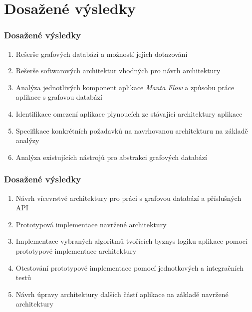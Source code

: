 \documentclass{beamer}
\newcounter{saveenumi}
\newcommand{\seti}{\setcounter{saveenumi}{\value{enumi}}}
\newcommand{\conti}{\setcounter{enumi}{\value{saveenumi}}}
\begin{document}
\section{Dosažené výsledky}
\begin{frame}
\frametitle{Dosažené výsledky}
   \begin{enumerate}
      \item Rešerše grafových databází a možností jejich dotazování
      \item Rešerše softwarových architektur vhodných pro návrh architektury
      \item Analýza jednotlivých komponent aplikace \textit{Manta Flow} a způsobu práce aplikace s grafovou databází
      \item Identifikace omezení aplikace plynoucích ze stávající architektury aplikace
      \item Specifikace konkrétních požadavků na navrhovanou architekturu na základě analýzy
      \item Analýza existujících nástrojů pro abstrakci grafových databází
      \seti
   \end{enumerate}
\end{frame}
\begin{frame}
\frametitle{Dosažené výsledky}
   \begin{enumerate}
      \conti
      \item Návrh vícevrstvé architektury pro práci s grafovou databází a příslušných API
      \item Prototypová implementace navržené architektury
      \item Implementace vybraných algoritmů tvořících byznys logiku aplikace pomocí prototypové implementace architektury
      \item Otestování prototypové implementace pomocí jednotkových a integračních testů
      \item Návrh úpravy architektury dalších částí aplikace na základě navržené architektury
   \end{enumerate}
\end{frame}
\end{document}
